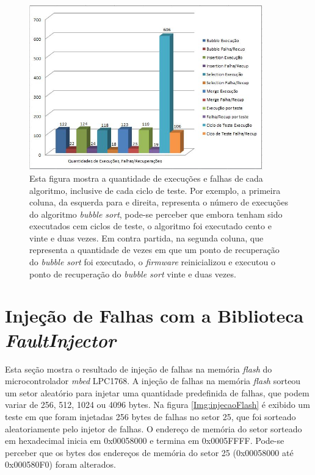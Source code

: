 \begin{figure}[h]
	\centering
	\includegraphics[width=0.9\textwidth]{figuras/testeFaultRecovery.jpg}
	\caption[Resultados Obtidos da Biblioteca \textit{FaultRecovery}]{Esta figura mostra a quantidade de execuções e falhas de cada algoritmo, inclusive de cada ciclo de teste. Por exemplo, a primeira coluna, da esquerda para e direita, representa o número de execuções do algoritmo \textit{bubble sort}, pode-se perceber que embora tenham sido executados cem ciclos de teste, o algoritmo foi executado cento e vinte e duas vezes. Em contra partida, na segunda coluna, que representa a quantidade de vezes em que um ponto de recuperação do \textit{bubble sort} foi executado, o \textit{firmware} reinicializou e executou o ponto de recuperação do \textit{bubble sort} vinte e duas vezes.}
	\label{Img:testeFaultRecovery}	
\end{figure}


\section{Injeção de Falhas com a Biblioteca \textit{FaultInjector}}

Esta seção mostra o resultado de injeção de falhas na memória \textit{flash} do microcontrolador \textit{mbed} LPC1768. A injeção de falhas na memória \textit{flash} sorteou um setor aleatório para injetar uma quantidade predefinida de falhas, que podem variar de 256, 512, 1024 ou 4096 bytes. Na figura \ref{Img:injecaoFlash} é exibido um teste em que foram injetadas 256 bytes de falhas no setor 25, que foi sorteado aleatoriamente pelo injetor de falhas. O endereço de memória do setor sorteado em hexadecimal inicia em 0x00058000 e termina em 0x0005FFFF. Pode-se perceber que os bytes dos endereços de memória do setor 25 (0x00058000 até 0x000580F0) foram alterados.

